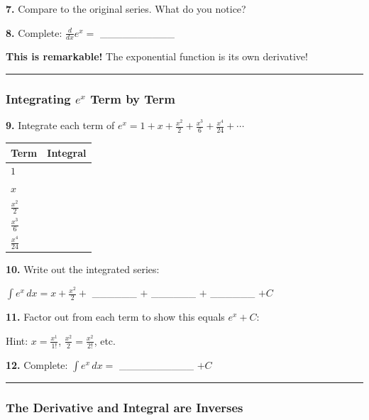 \documentclass[
  11pt,
]{article}
\begin{document}
\textbf{7.} Compare to the original series. What do you notice?

\textbf{8.} Complete: \(\frac{d}{dx}e^x ={}\) \_\_\_\_\_\_\_\_\_\_

\textbf{This is remarkable!} The exponential function is its own
derivative!

\begin{center}\rule{0.5\linewidth}{0.5pt}\end{center}

\hypertarget{integrating-ex-term-by-term}{%
\subsubsection{\texorpdfstring{Integrating \(e^x\) Term by
Term}{Integrating e\^{}x Term by Term}}\label{integrating-ex-term-by-term}}

\textbf{9.} Integrate each term of
\(e^x = 1 + x + \frac{x^2}{2} + \frac{x^3}{6} + \frac{x^4}{24} + \cdots\)

\begin{longtable}[]{@{}ll@{}}
\toprule\noalign{}
Term & Integral \\
\midrule\noalign{}
\endhead
\bottomrule\noalign{}
\endlastfoot
\(1\) & \\
\(x\) & \\
\(\frac{x^2}{2}\) & \\
\(\frac{x^3}{6}\) & \\
\(\frac{x^4}{24}\) & \\
\end{longtable}

\textbf{10.} Write out the integrated series:

\(\int e^x \, dx = x + \frac{x^2}{2} +{}\) \_\_\_\_\_\_ \(+\)
\_\_\_\_\_\_ \(+\) \_\_\_\_\_\_ \(+ C\)

\textbf{11.} Factor out from each term to show this equals \(e^x + C\):

Hint: \(x = \frac{x^1}{1!}\), \(\frac{x^2}{2} = \frac{x^2}{2!}\), etc.

\textbf{12.} Complete: \(\int e^x \, dx ={}\) \_\_\_\_\_\_\_\_\_\_
\(+ C\)

\begin{center}\rule{0.5\linewidth}{0.5pt}\end{center}

\hypertarget{the-derivative-and-integral-are-inverses}{%
\subsubsection{The Derivative and Integral are
Inverses}\label{the-derivative-and-integral-are-inverses}}
\end{document}
